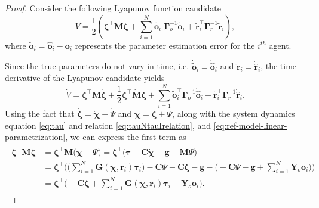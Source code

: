 \begin{proof}
    Consider the following Lyapunov function candidate
    \begin{equation}
        V = \frac{1}{2}\left( \boldsymbol{\zeta}^\top \mathbf {M} \boldsymbol{\zeta} + \sum _{i=1}^{N} \widetilde{\mathbf{o}}_i^\top \boldsymbol{\Gamma }_o^{-1}\widetilde{\mathbf{o}}_i + \widetilde{\mathbf{r}}_i^\top \boldsymbol{\Gamma }_r^{-1} \widetilde{\mathbf{r}}_i \right),
    \end{equation}
    where $\widetilde{\mathbf {o}}_i = \hat{\mathbf{o}}_i - \mathbf{o}_i$ represents the parameter estimation error for the $i^{th}$ agent.

    Since the true parameters do not vary in time, i.e. $\dot{\widetilde{\mathbf {o}}}_i = \dot{\hat{\mathbf{o}}}_i$ and $\dot{\widetilde{\mathbf {r}}}_i = \dot{\hat{\mathbf{r}}}_i$, the time derivative of the Lyapunov candidate yields
    \begin{equation}
        \dot{V} = \boldsymbol{\zeta}^\top \mathbf{M} \dot{\boldsymbol{\zeta}} + \frac{1}{2} \boldsymbol{\zeta}^\top \dot{\mathbf{M}} \boldsymbol{\zeta} + \sum\limits_{i=1}^{N} \widetilde{\mathbf{o}}_i^\top \boldsymbol{\Gamma}_o^{-1} \dot{\hat{\mathbf{o}}}_i + \widetilde{\mathbf{r}}_i^\top \boldsymbol{\Gamma}_r^{-1}\dot{\hat{\mathbf{r}}}_i.
        \label{eq:adaptive-lyapunov-derivative}
    \end{equation}
    Using the fact that $\dot{\boldsymbol{\zeta}} = \ddot{\boldsymbol{\chi}} - \dot{\Psi}$ and $\dot{\boldsymbol{\chi}} = \boldsymbol{\zeta} + \Psi$, along with the system dynamics equation \eqref{eq:tau} and relation \eqref{eq:tauNtauIrelation}, and \eqref{eq:ref-model-linear-parametrization}, we can express the first term as
    \begin{align} 
    \begin{split}
        \boldsymbol{\zeta}^\top \mathbf {M} \dot{\boldsymbol{\zeta}} &= \boldsymbol{\zeta}^\top\mathbf{M}\bigl(\ddot{\boldsymbol{\chi}} - \dot{\Psi}\bigr)
        = \boldsymbol{\zeta}^\top\bigl(\boldsymbol{\tau} - \mathbf{C}\dot{\boldsymbol{\chi}} - \mathbf{g} - \mathbf{M}\dot{\Psi}\bigr)\\
        &= \boldsymbol{\zeta}^\top\Biggl(\biggl(\sum_{i=1}^N\mathbf{G}(\boldsymbol{\chi}, \mathbf{r}_i)\boldsymbol{\tau}_i\biggr) -\mathbf{C}\Psi - \mathbf{C}\boldsymbol{\zeta} - \mathbf{g} - \biggl(-\mathbf{C}\Psi-\mathbf{g}+\sum_{i=1}^N\mathbf{Y}_o\mathbf{o}_i\biggr)\Biggr)\\
        &= \boldsymbol{\zeta}^\top\Biggl( - \mathbf{C}\boldsymbol{\zeta}+\sum_{i=1}^N\mathbf{G}(\boldsymbol{\chi}, \mathbf{r}_i)\boldsymbol{\tau}_i - \mathbf{Y}_o\mathbf{o}_i \Biggr).

\end{split}
\end{align}
\end{proof}
